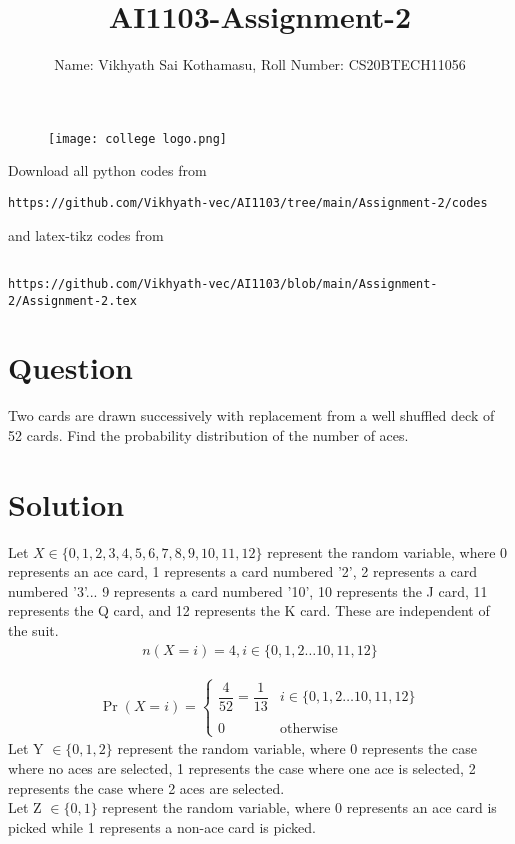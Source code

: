 \documentclass[journal,12pt,twocolumn]{IEEEtran}
\begin{document}
\title{AI1103-Assignment-2}
\author{Name: Vikhyath Sai Kothamasu, Roll Number: CS20BTECH11056}
\maketitle
\newpage
\bigskip
\renewcommand{\thefigure}{\theenumi}
\renewcommand{\thetable}{\theenumi}

\begin{figure} [h]
    \texttt{[image: college logo.png]}
\end{figure}

Download all python codes from 
\begin{lstlisting}
https://github.com/Vikhyath-vec/AI1103/tree/main/Assignment-2/codes
\end{lstlisting}
%
and latex-tikz codes from 
%
\begin{lstlisting}

https://github.com/Vikhyath-vec/AI1103/blob/main/Assignment-2/Assignment-2.tex
\end{lstlisting}
\section*{Question}
Two cards are drawn successively with replacement from a well shuffled deck of 52 cards. Find the probability distribution of the number of aces.

\section*{Solution}

Let $X \in \{0,1,2,3,4,5,6,7,8,9,10,11,12\}$ represent the random variable, where 0 represents an ace card, 1 represents a card numbered '2', 2 represents a card numbered '3'... 9 represents a card numbered '10', 10 represents the J card, 11 represents the Q card, and 12 represents the K card. These are independent of the suit. 
\begin{align}
    n(X=i) = 4, i \in \{0, 1, 2\hdots 10, 11, 12\}
\end{align}

\begin{align}
    \Pr(X=i) = 
	\begin{cases}
	\dfrac{4}{52} = \dfrac{1}{13} &  i \in \{0, 1, 2\hdots 10, 11, 12\}\\ ~\\[-1em]
	0 & \text{otherwise}
	\end{cases}
\end{align}
Let Y $\in \{0,1,2\}$ represent the random variable, where 0 represents the case where no aces are selected, 1 represents the case where one ace is selected, 2 represents the case where 2 aces are selected.
\\Let Z $\in \{0,1\}$ represent the random variable, where 0 represents an ace card is picked while 1 represents a non-ace card is picked.
\end{document}
